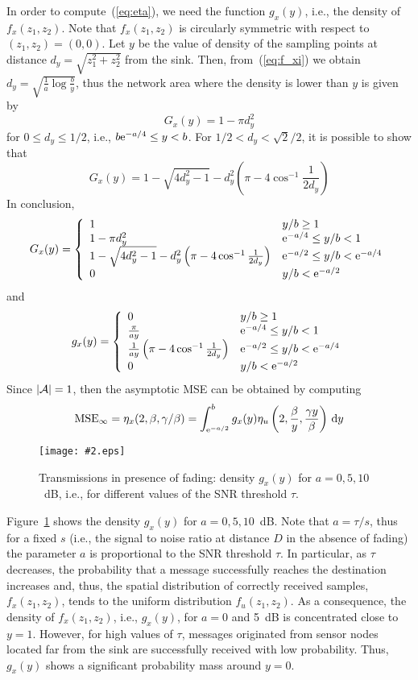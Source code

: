 \documentclass[11pt, draftcls, onecolumn, a4paper]{IEEEtran}
\newcommand{\insertfig}[4]{
\begin{figure}[ht]
\centerline{\texttt{[image: \#2.eps]}}
\caption{#3}\label{#4}\end{figure}}
\newcommand{\ee}{{\rm e}}
\def\MSEinf{{\rm MSE}_{\infty}}
\newcommand{\Ac}{{\cal A}}
\begin{document}
In order to compute~(\ref{eq:eta}), we need the function $g_{x}(y)$,
i.e., the density of $f_{x}(z_1,z_2)$. Note that $f_{x}(z_1,z_2)$
is circularly symmetric with respect to $(z_1,z_2)=(0,0)$.  Let $y$ be
the value of density of the sampling points at distance 
$d_y=\sqrt{z_1^2+z_2^2}$ from
the sink.  Then, from~(\ref{eq:f_xi}) we obtain
$d_y=\sqrt{\frac{1}{a}\log\frac{b}{y}}$, thus the network area where
the density is lower than $y$ is given by
\[ G_{x}(y) = 1-\pi d_y^2 \]
for $0\le d_y \le 1/2$, i.e.,  $b\ee^{-a/4} \le y<b$.
For $1/2<d_y<\sqrt{2}/2$, it is possible to show that
\[  G_{x}(y) = 1-\sqrt{4d_y^2-1}-d_y^2\left(\pi-4\cos^{-1}\frac{1}{2d_y} \right) \] 
In conclusion,
\begin{equation}
G_{x}(y) = \left\{
\begin{array}{ll}
1           &  y/b \ge 1 \\
1-\pi d_y^2 &  \ee^{-a/4} \le y/b < 1 \\
1-\sqrt{4d_y^2-1}-d_y^2\left(\pi-4\cos^{-1}\frac{1}{2d_y} \right) &  \ee^{-a/2} \le y/b < \ee^{-a/4} \\
0   & y/b<  \ee^{-a/2} 
\end{array}
\right.
\end{equation}
and
\begin{equation}
g_{x}(y) = \left\{
\begin{array}{ll}
0           &  y/b \ge 1 \\
\frac{\pi}{ay} &  \ee^{-a/4} \le y/b < 1 \\
\frac{1}{ay}\left(\pi-4\cos^{-1}\frac{1}{2d_y} \right) &  \ee^{-a/2} \le y/b < \ee^{-a/4} \\
0   & y/b <  \ee^{-a/2} 
\end{array}
\right.
\label{eq:g_xi}
\end{equation}
Since $|\Ac|=1$, then the asymptotic MSE can be obtained by computing
\begin{eqnarray}
\MSEinf=\eta_x(2,\beta,\gamma/\beta) = \int_{\ee^{-a/2}}^b g_x(y) \eta_u\left(2, \frac{\beta}{y}, \frac{\gamma y}{\beta}\right)\dd y
\label{eq:eta_xi_2}
\end{eqnarray}

\insertfig{0.8}{g}{Transmissions in presence of fading: density 
$g_x(y)$ for $a=0,5,10$~dB, i.e., for different values of the 
SNR threshold $\tau$.}{fig:g}

Figure~\ref{fig:g} shows the density $g_x(y)$ for $a=0,5,10$~dB. 
Note that $a=\tau/s$, thus for a fixed $s$ (i.e.,
the signal to noise ratio at distance $D$ in the absence of fading)
the parameter $a$ is proportional to the SNR threshold $\tau$. In particular,
as $\tau$ decreases, the probability that a message successfully
reaches the destination increases and, thus, the spatial
distribution of correctly received samples, $f_x(z_1,z_2)$, tends to
the uniform distribution $f_u(z_1,z_2)$. As a consequence, the density of
$f_{x}(z_1,z_2)$, i.e., $g_x(y)$, for $a=0$ and 5~dB 
is concentrated close to $y=1$. 
However, for high values of $\tau$, messages originated from
sensor nodes located far from the sink are successfully received
with low probability. Thus, $g_x(y)$ shows a significant 
probability mass around $y=0$.
\end{document}

